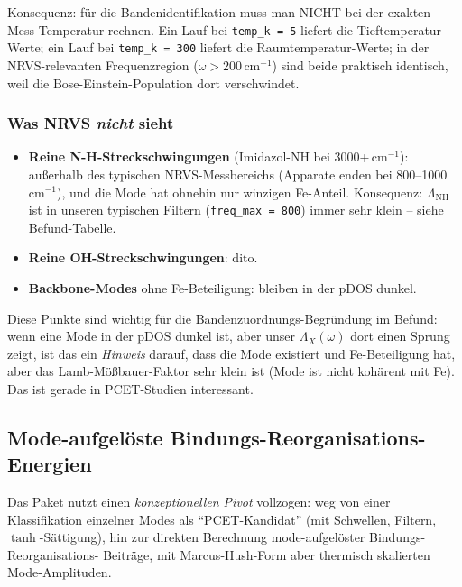\documentclass[11pt,a4paper,twoside]{article}
\theoremstyle{remark}
\begin{document}
Konsequenz: f\"ur die Bandenidentifikation muss man NICHT bei der
exakten Mess-Temperatur rechnen. Ein Lauf bei
\texttt{temp\_k = 5} liefert die Tieftemperatur-Werte; ein Lauf bei
\texttt{temp\_k = 300} liefert die Raumtemperatur-Werte; in der
NRVS-relevanten Frequenzregion ($\omega > 200$\,cm$^{-1}$) sind
beide praktisch identisch, weil die Bose-Einstein-Population dort
verschwindet.

\subsubsection*{Was NRVS \emph{nicht} sieht}

\begin{itemize}\setlength{\itemsep}{0pt}
  \item \textbf{Reine N-H-Streckschwingungen} (Imidazol-NH bei 3000+\,cm$^{-1}$):
        au{\ss}erhalb des typischen NRVS-Messbereichs (Apparate enden
        bei 800--1000\,cm$^{-1}$), und die Mode hat ohnehin nur
        winzigen Fe-Anteil. Konsequenz: $\Lambda_\text{NH}$ ist in
        unseren typischen Filtern (\texttt{freq\_max = 800}) immer
        sehr klein -- siehe Befund-Tabelle.
  \item \textbf{Reine OH-Streckschwingungen}: dito.
  \item \textbf{Backbone-Modes} ohne Fe-Beteiligung: bleiben in der
        pDOS dunkel.
\end{itemize}

Diese Punkte sind wichtig f\"ur die Bandenzuordnungs-Begr\"undung im
Befund: wenn eine Mode in der pDOS dunkel ist, aber unser
$\Lambda_X(\omega)$ dort einen Sprung zeigt, ist das ein \emph{Hinweis}
darauf, dass die Mode existiert und Fe-Beteiligung hat, aber das
Lamb-M\"o{\ss}bauer-Faktor sehr klein ist (Mode ist nicht koh\"arent
mit Fe). Das ist gerade in PCET-Studien interessant.


\subsection{Mode-aufgel\"oste Bindungs-Reorganisations-Energien}
\label{sec:reorg}

Das Paket nutzt einen \emph{konzeptionellen
Pivot} vollzogen: weg von einer Klassifikation einzelner Modes als
"`PCET-Kandidat"' (mit Schwellen, Filtern, $\tanh$-S\"attigung), hin
zur direkten Berechnung mode-aufgel\"oster Bindungs-Reorganisations-
Beitr\"age, mit Marcus-Hush-Form aber thermisch skalierten
Mode-Amplituden.
\end{document}
